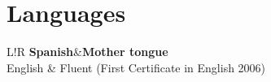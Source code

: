 \documentclass[10pt]{article}
\newcommand\VRule{\color{lightgray}\vrule width 0.5pt}
\begin{document}

\section*{Languages}

\begin{tabular}{L!{\VRule}R}
{\bf Spanish}&{\bf Mother tongue}\\
English & Fluent (First Certificate in English 2006)\\
\end{tabular}
\end{document}
